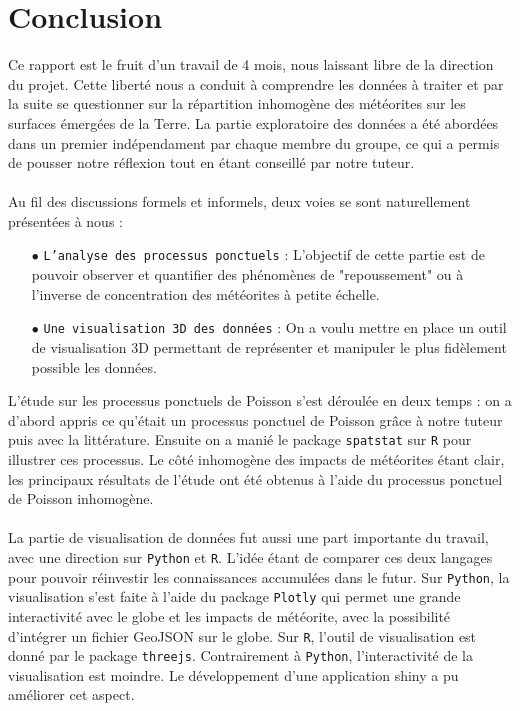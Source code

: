 \documentclass[12pt]{article}
\begin{document}
\section{Conclusion}
Ce rapport est le fruit d'un travail de 4 mois, nous laissant libre de la direction du projet. Cette liberté nous a conduit à comprendre les données à traiter et par la suite se questionner sur la répartition inhomogène des météorites sur les surfaces émergées de la Terre. 
La partie exploratoire des données a été abordées dans un premier indépendament par chaque membre du groupe, ce qui a permis de pousser notre réflexion tout en étant conseillé par notre tuteur.\\
\\
Au fil des discussions formels et informels, deux voies se sont naturellement présentées à nous :
\\
\begin{itemize}
    \item[$\bullet$] \texttt{L'analyse des processus ponctuels} : L'objectif de cette partie est de pouvoir observer et quantifier des phénomènes de "repoussement" ou à l'inverse de concentration des météorites à petite échelle.
    \\
    \item[$\bullet$] \texttt{Une visualisation 3D des données} : On a voulu mettre en place un outil de visualisation 3D permettant de représenter et manipuler le plus fidèlement possible les données.\\
\end{itemize}
L'étude sur les processus ponctuels de Poisson s'est déroulée en deux temps : on a d'abord appris ce qu'était un processus ponctuel de Poisson grâce à notre tuteur puis avec la littérature. Ensuite on a manié le package \texttt{spatstat} sur \texttt{R} pour illustrer ces processus. Le côté inhomogène des impacts de météorites étant clair, les principaux résultats de l'étude ont été obtenus à l'aide du processus ponctuel de Poisson inhomogène.\\
\\
La partie de visualisation de données fut aussi une part importante du travail, avec une direction sur \texttt{Python} et \texttt{R}. L'idée étant de comparer ces deux langages pour pouvoir réinvestir les connaissances accumulées dans le futur. Sur \texttt{Python}, la visualisation s'est faite à l'aide du package \texttt{Plotly} qui permet une grande interactivité avec le globe et les impacts de météorite, avec la possibilité d'intégrer un fichier GeoJSON sur le globe. Sur \texttt{R}, l'outil de visualisation est donné par le package \texttt{threejs}. Contrairement à \texttt{Python}, l'interactivité de la visualisation est moindre. Le développement d'une application shiny a pu améliorer cet aspect.\\
\end{document}
